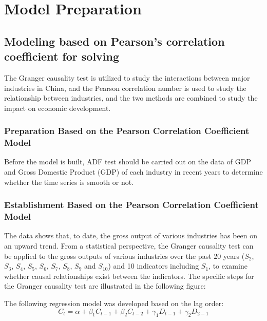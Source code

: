 \documentclass[12pt]{article}  %
\begin{document}
\vspace{-1cm}%

\section{Model Preparation} %
\subsection{Modeling based on Pearson's correlation coefficient for solving} %
	The Granger causality test\cite{1} is utilized to study the interactions between major industries in China, and the Pearson correlation number\cite{2} is used to study the relationship between industries, and the two methods are combined to study the impact on economic development.

\subsubsection{Preparation Based on the Pearson Correlation Coefficient Model} %
	Before the model is built, ADF test should be carried out on the data of GDP and Gross Domestic Product (GDP) of each industry in recent years to determine whether the time series is smooth or not.
	
\subsubsection{Establishment Based on the Pearson Correlation Coefficient Model} %

	The data shows that, to date, the gross output of various industries has been on an upward trend. From a statistical perspective, the Granger causality test can be applied to the gross outputs of various industries over the past 20 years ($S_{2}$, $S_{3}$, $S_{4}$, $S_{5}$, $S_{6}$, $S_{7}$, $S_{8}$, $S_{9}$ and $S_{10}$) and 10 indicators including $S_{1}$, to examine whether causal relationships exist between the indicators. The specific steps for the Granger causality test are illustrated in the following figure:
	
	The following regression model was developed based on the lag order:
	\begin{equation}
	{C_t} = \alpha  + {\beta _1}{C_{t - 1}} + {\beta _2}{C_{t - 2}} + {\gamma _1}{D_{t - 1}} + {\gamma _2}{D_{2 - 1}}
	\end{equation}
\end{document}
